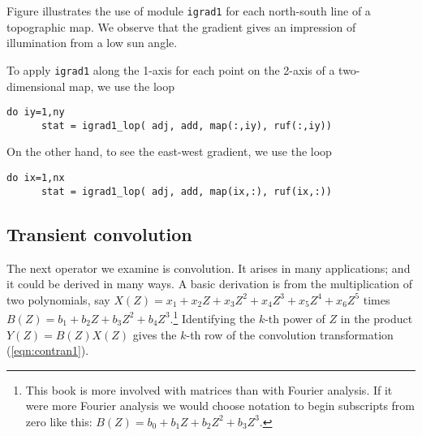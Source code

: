 
\par
Figure  illustrates the use of module \texttt{igrad1}
for each north-south line of a topographic map.
We observe that the gradient gives an impression of
illumination from a low sun angle.

To apply \texttt{igrad1} along the 1-axis
for each point on the 2-axis of a two-dimensional map, we use the loop 
\begin{verbatim}
do iy=1,ny
      stat = igrad1_lop( adj, add, map(:,iy), ruf(:,iy))
\end{verbatim}
On the other hand, to see the east-west gradient, we use the loop
\begin{verbatim}
do ix=1,nx 
      stat = igrad1_lop( adj, add, map(ix,:), ruf(ix,:))
\end{verbatim}




\subsection{Transient convolution}

\par
The next operator we examine is convolution.
It arises in many applications; and it could be derived in many ways.
A basic derivation is from the multiplication of two polynomials, say
$X(Z) = x_1 + x_2 Z + x_3 Z^2 + x_4 Z^3 + x_5 Z^4 + x_6 Z^5$ times
$B(Z) = b_1 + b_2 Z + b_3 Z^2 + b_4 Z^3$.\footnote{
	This book is more involved with matrices than with Fourier analysis.
	If it were more Fourier analysis we would choose notation
	to begin subscripts from zero like this:
	$B(Z) = b_0 + b_1 Z + b_2 Z^2 + b_3 Z^3$.}
Identifying the $k$-th power of $Z$ in the product
$Y(Z)=B(Z)X(Z)$ gives the $k$-th row of the convolution transformation
(\ref{eqn:contran1}).

